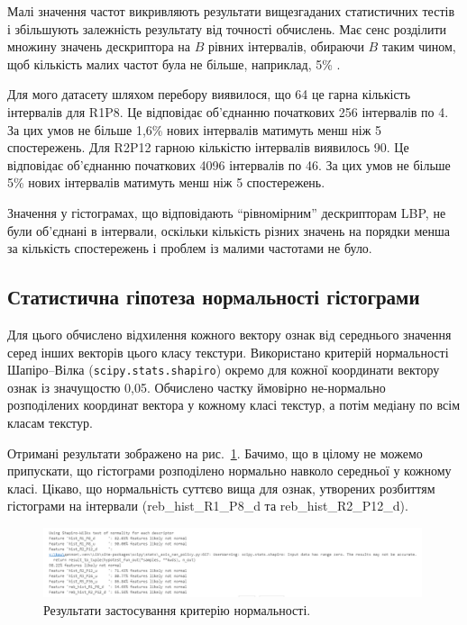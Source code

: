 Малі значення частот викривляють результати вищезгаданих статистичних тестів і збільшують залежність результату від точності обчислень.
Має сенс розділити множину значень дескриптора на $B$ рівних інтервалів, обираючи $B$ таким чином, щоб кількість малих частот була не більше, наприклад, 5\% \cite{ojala2002}.

Для мого датасету шляхом перебору виявилося, що 64 це гарна кількість інтервалів для R1P8. 
Це відповідає об'єднанню початкових 256 інтервалів по 4. 
За цих умов не більше 1,6\% нових інтервалів матимуть менш ніж 5 спостережень.
Для R2P12 гарною кількістю інтервалів виявилось 90. 
Це відповідає об'єднанню початкових 4096 інтервалів по 46. 
За цих умов не більше 5\% нових інтервалів матимуть менш ніж 5 спостережень.

Значення у гістограмах, що відповідають ``рівномірним'' дескрипторам LBP, не були об'єднані в інтервали, 
оскільки кількість різних значень на порядки менша за кількість спостережень і проблем із малими частотами не було.

\subsection{Статистична гіпотеза нормальності гістограми}\label{section2.1c1}\hfill

Для цього обчислено відхилення кожного вектору ознак від середнього значення серед інших векторів цього класу текстури.
Використано критерій нормальності Шапіро--Вілка (\verb|scipy.stats.shapiro|) окремо для кожної координати вектору ознак із значущостю 0,05.
Обчислено частку ймовірно не-нормально розподілених координат вектора у кожному класі текстур, а потім медіану по всім класам текстур.

Отримані результати зображено на рис.~\ref{fig:normaltest}. 
Бачимо, що в цілому не можемо припускати, що гістограми розподілено нормально навколо середньої у кожному класі.
Цікаво, що нормальність суттєво вища для ознак, утворених розбиттям гістограми на інтервали (reb\_hist\_R1\_P8\_d та reb\_hist\_R2\_P12\_d).

\begin{figure}[h]
    \centering
    \includegraphics[width=0.99\textwidth]{img/normality-test.png}
    \caption{
        Результати застосування критерію нормальності.
    }
    \label{fig:normaltest}
\end{figure}

